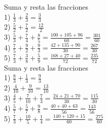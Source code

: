 \documentclass[a4paper,12pt]{article}
\begin{document}
 \pagebreak 
 Suma  y resta las fracciones\vspace{1cm}\\ 
1) $\frac{1}{3}+\frac{2}{3}=\frac{3}{3}$\vspace{1cm}\\ 
2) $\frac{5}{2}+\frac{7}{2}=\frac{12}{2}$\vspace{1cm}\\ 
3) $\frac{5}{3}+\frac{7}{4}+\frac{8}{5}  =\frac{100+105+96}{60}= \frac{301}{60}  $\vspace{1cm}\\ 
4) $\frac{7}{5}+\frac{9}{2}+\frac{9}{3}  =\frac{42+135+90}{30}= \frac{267}{30}  $\vspace{1cm}\\ 
5) $\frac{7}{3}+\frac{3}{8}+\frac{5}{9}  =\frac{168+27+40}{72}= \frac{235}{72}  $\vspace{1cm}\\ 

 \pagebreak 
 Suma  y resta las fracciones\vspace{1cm}\\ 
1) $\frac{8}{3}+\frac{1}{3}=\frac{9}{3}$\vspace{1cm}\\ 
2) $\frac{4}{10}+\frac{9}{10}=\frac{13}{10}$\vspace{1cm}\\ 
3) $\frac{4}{5}+\frac{7}{10}+\frac{7}{3}  =\frac{24+21+70}{30}= \frac{115}{30}  $\vspace{1cm}\\ 
4) $\frac{5}{7}+\frac{5}{7}+\frac{9}{8}  =\frac{40+40+63}{56}= \frac{143}{56}  $\vspace{1cm}\\ 
5) $\frac{7}{3}+\frac{10}{5}+\frac{1}{4}  =\frac{140+120+15}{60}= \frac{275}{60}  $\vspace{1cm}\\ 

 \pagebreak 
\end{document}
